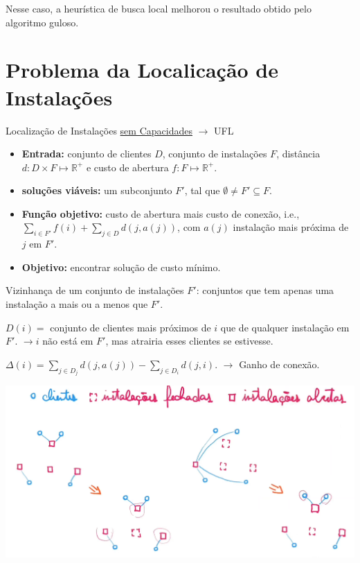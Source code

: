 Nesse caso, a heurística de busca local melhorou o resultado obtido pelo algoritmo guloso.

\section{Problema da Localicação de Instalações}

Localização de Instalações \underline{sem Capacidades} $\to$ UFL

\begin{itemize}
    \item \textbf{Entrada:} conjunto de clientes $D$, conjunto de instalações $F$, distância $d: D \times F \mapsto \mathbb{R}^+$ e custo de abertura $f: F \mapsto \mathbb{R}^+$.
    \item \textbf{soluções viáveis:} um subconjunto $F'$, tal que $\emptyset \neq F' \subseteq F$.
    \item \textbf{Função objetivo:} custo de abertura mais custo de conexão, i.e., $\sum_{i \in F'} f(i) + \sum_{j \in D}d(j, a(j))$, com $a(j)$ instalação mais próxima de $j$ em $F'$.
    \item \textbf{Objetivo:} encontrar solução de custo mínimo.
\end{itemize}

 Vizinhança de um conjunto de instalações $F'$: conjuntos que tem apenas uma instalação a mais ou a menos que $F'$.

 $D(i) = $ conjunto de clientes mais próximos de $i$ que de qualquer instalação em $F'$. $\to i$ não está em $F'$, mas atrairia esses clientes se estivesse.

 $\Delta(i) = \sum_{j \in D_j}d(j, a(j)) - \sum_{j \in D_i} d(j, i)$. $\to$ Ganho de conexão.

 \begin{algorithm}
 \SetAlgoLined
 \end{algorithm}

 \begin{example}
     \includegraphics[width=.8\textwidth]{img/localizacao_instalacoes.png}
 \end{example}

